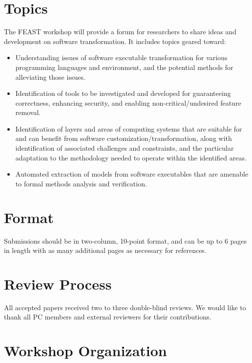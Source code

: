 \documentclass[sigconf]{acmart}
\begin{document}
\section{Topics}
The FEAST workshop will provide a forum for researchers to share
ideas and development on software transformation.
It includes topics geared toward:
\begin{itemize}

\item Understanding issues of software executable transformation for
  various programming languages and environment, and the potential
  methods for alleviating those issues.

\item Identification of tools to be investigated and developed for
  guaranteeing correctness, enhancing security, and enabling
  non-critical/undesired feature removal.

\item Identification of layers and areas of computing systems that are
  suitable for and can benefit from software
  customization/transformation, along with identification of
  associated challenges and constraints, and the particular adaptation
  to the methodology needed to operate within the identified areas.

\item Automated extraction of models from software executables that
  are amenable to formal methods analysis and verification.

\end{itemize}

\section{Format}
Submissions should be in two-column, 10-point
format, and can be up to 6 pages in length with as
many additional pages as necessary for references.

\section{Review Process}
All accepted papers received two to three double-blind reviews.
We would like to thank all PC members and external reviewers for
their contributions.

\section{Workshop Organization}
\end{document}
